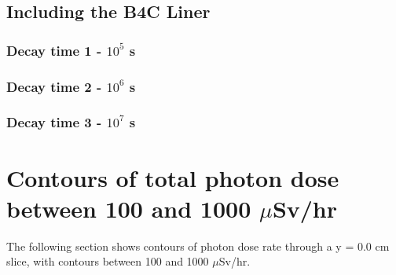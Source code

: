 \documentclass[12pt]{article}
\begin{document}
\subsection{Including the B4C Liner}
\subsubsection{Decay time 1 - $10^5$ s}

\clearpage
\subsubsection{Decay time 2 - $10^6$ s}

\clearpage
\subsubsection{Decay time 3 - $10^7$ s}


\newpage
\clearpage
\section{Contours of total photon dose between 100 and 1000 $\mu$Sv/hr}
\label{appendix_f}
The following section shows contours of photon dose rate through a y = 0.0 cm slice, with contours between 100 and 1000 $\mu$Sv/hr.
\end{document}
